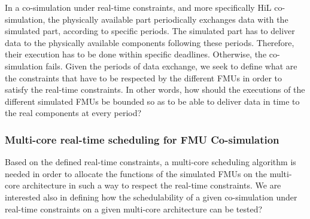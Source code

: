 In a co-simulation under real-time constraints, and more specifically HiL co-simulation, the physically available part periodically exchanges data with the simulated part, according to specific periods. The simulated part has to deliver data to the physically available components following these periods. Therefore, their execution has to be done within specific deadlines. Otherwise, the co-simulation fails. Given the periods of data exchange, we seek to define what are the constraints that have to be respected by the different FMUs in order to satisfy the real-time constraints. In other words, how should the executions of the different simulated FMUs be bounded so as to be able to deliver data in time to the real components at every period?

\subsubsection{Multi-core real-time scheduling for FMU Co-simulation}

Based on the defined real-time constraints, a multi-core scheduling algorithm is needed in order to allocate the functions of the simulated FMUs on the multi-core architecture in such a way to respect the real-time constraints. We are interested also in defining how the schedulability of a given co-simulation under real-time constraints on a given multi-core architecture can be tested?
